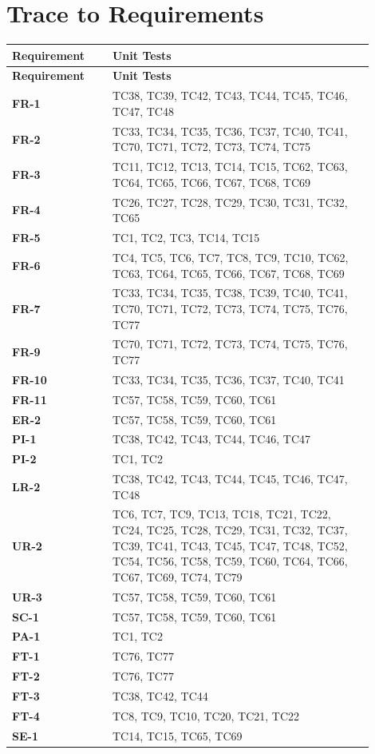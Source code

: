 \documentclass[12pt, titlepage]{article}
\begin{document}
\section{Trace to Requirements}
\begin{longtable}{p{0.25\linewidth} p{0.65\linewidth}}
\toprule
\textbf{Requirement} & \textbf{Unit Tests} \\
\midrule
\endfirsthead
\toprule
\textbf{Requirement} & \textbf{Unit Tests} \\
\midrule
\endhead
\bottomrule
\endfoot

\textbf{FR-1}  & TC38, TC39, TC42, TC43, TC44, TC45, TC46, TC47, TC48 \\[4mm]
\textbf{FR-2}  & TC33, TC34, TC35, TC36, TC37, TC40, TC41, TC70, TC71, TC72, TC73, TC74, TC75 \\[4mm]
\textbf{FR-3}  & TC11, TC12, TC13, TC14, TC15, TC62, TC63, TC64, TC65, TC66, TC67, TC68, TC69 \\[4mm]
\textbf{FR-4}  & TC26, TC27, TC28, TC29, TC30, TC31, TC32, TC65 \\[4mm]
\textbf{FR-5}  & TC1, TC2, TC3, TC14, TC15 \\[4mm]
\textbf{FR-6}  & TC4, TC5, TC6, TC7, TC8, TC9, TC10, TC62, TC63, TC64, TC65, TC66, TC67, TC68, TC69 \\[4mm]
\textbf{FR-7}  & TC33, TC34, TC35, TC38, TC39, TC40, TC41, TC70, TC71, TC72, TC73, TC74, TC75, TC76, TC77 \\[4mm]
\textbf{FR-9}  & TC70, TC71, TC72, TC73, TC74, TC75, TC76, TC77 \\[4mm]
\textbf{FR-10} & TC33, TC34, TC35, TC36, TC37, TC40, TC41 \\[4mm]
\textbf{FR-11} & TC57, TC58, TC59, TC60, TC61 \\[4mm]

\textbf{ER-2}  & TC57, TC58, TC59, TC60, TC61 \\[4mm]
\textbf{PI-1}  & TC38, TC42, TC43, TC44, TC46, TC47 \\[4mm]
\textbf{PI-2}  & TC1, TC2 \\[4mm]
\textbf{LR-2}  & TC38, TC42, TC43, TC44, TC45, TC46, TC47, TC48 \\[4mm]
\textbf{UR-2}  & TC6, TC7, TC9, TC13, TC18, TC21, TC22, TC24, TC25, TC28, TC29, TC31, TC32,
                  TC37, TC39, TC41, TC43, TC45, TC47, TC48, TC52, TC54, TC56, TC58, TC59,
                  TC60, TC64, TC66, TC67, TC69, TC74, TC79 \\[4mm]
\textbf{UR-3}  & TC57, TC58, TC59, TC60, TC61 \\[4mm]
\textbf{SC-1}  & TC57, TC58, TC59, TC60, TC61 \\[4mm]
\textbf{PA-1}  & TC1, TC2 \\[4mm]
\textbf{FT-1}  & TC76, TC77 \\[4mm]
\textbf{FT-2}  & TC76, TC77 \\[4mm]
\textbf{FT-3}  & TC38, TC42, TC44 \\[4mm]
\textbf{FT-4}  & TC8, TC9, TC10, TC20, TC21, TC22 \\[4mm]
\textbf{SE-1}  & TC14, TC15, TC65, TC69 \\[4mm]


\end{longtable}
\end{document}
